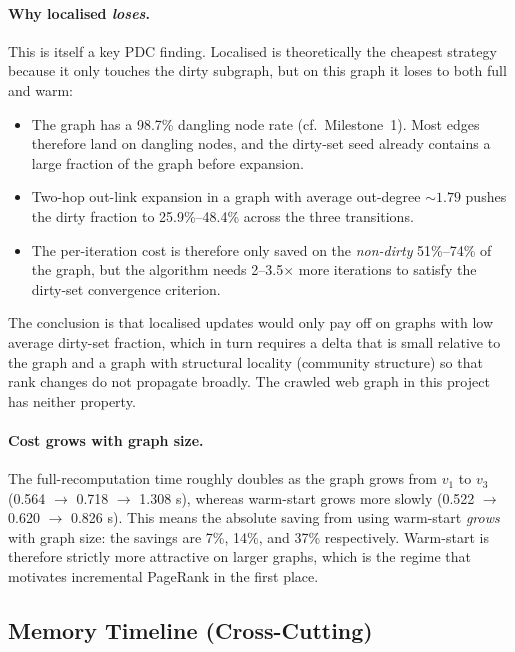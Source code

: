 \documentclass[11pt,a4paper]{article}
\begin{document}
\paragraph{Why localised \emph{loses}.} This is itself a key PDC
finding. Localised is theoretically the cheapest strategy because it
only touches the dirty subgraph, but on this graph it loses to both
full and warm:
\begin{itemize}
    \item The graph has a 98.7\% dangling node rate (cf.~Milestone~1).
    Most edges therefore land on dangling nodes, and the dirty-set
    seed already contains a large fraction of the graph before
    expansion.
    \item Two-hop out-link expansion in a graph with average
    out-degree ${\sim}1.79$ pushes the dirty fraction to
    25.9\%--48.4\% across the three transitions.
    \item The per-iteration cost is therefore only saved on the
    \emph{non-dirty} 51\%--74\% of the graph, but the algorithm needs
    2--3.5$\times$ more iterations to satisfy the dirty-set
    convergence criterion.
\end{itemize}

The conclusion is that localised updates would only pay off on graphs
with low average dirty-set fraction, which in turn requires a delta
that is small relative to the graph and a graph with structural
locality (community structure) so that rank changes do not propagate
broadly. The crawled web graph in this project has neither property.

\paragraph{Cost grows with graph size.} The full-recomputation time
roughly doubles as the graph grows from $v_1$ to $v_3$ (0.564 $\to$
0.718 $\to$ 1.308 s), whereas warm-start grows more slowly (0.522 $\to$
0.620 $\to$ 0.826 s). This means the absolute saving from using
warm-start \emph{grows} with graph size: the savings are 7\%, 14\%, and
37\% respectively. Warm-start is therefore strictly more attractive on
larger graphs, which is the regime that motivates incremental
PageRank in the first place.

\subsection{Memory Timeline (Cross-Cutting)}
\label{sec:res-memory}
\end{document}
